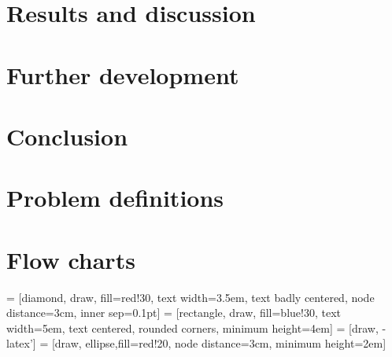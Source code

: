 \documentclass[a4paper, 10pt, twoside, openright]{book}
\begin{document}
\chapter{Results and discussion}\label{chap:res}


\chapter{Further development}\label{chap:further}


\chapter{Conclusion}\label{chap:concl}







\appendix
\chapter{Problem definitions} \label{definitions}







\chapter{Flow charts} \label{appendix:flow_charts}

 = [diamond, draw, fill=red!30,
    text width=3.5em, text badly centered, node distance=3cm, inner sep=0.1pt]
 = [rectangle, draw, fill=blue!30,
    text width=5em, text centered, rounded corners, minimum height=4em]
 = [draw, -latex']
 = [draw, ellipse,fill=red!20, node distance=3cm,
    minimum height=2em]
\end{document}
